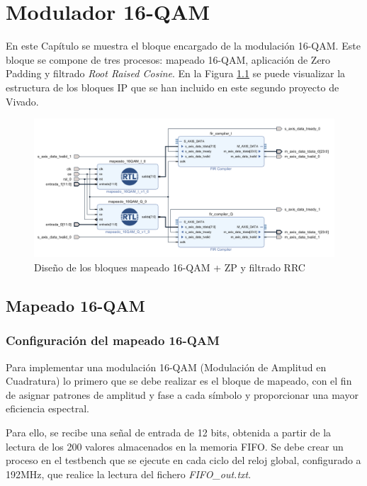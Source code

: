 \chapter{Modulador 16-QAM}
\label{section:qam}


En este Capítulo se muestra el bloque encargado de la modulación 16-QAM. Este bloque se compone de tres procesos: mapeado 16-QAM, aplicación de Zero Padding y filtrado \textit{Root Raised Cosine}. En la Figura \ref{fig:qam_fir} se puede visualizar la estructura de los bloques IP que se han incluido en este segundo proyecto de Vivado. 

\vspace{2mm}

\begin{figure}[h]
	\centering
	\includegraphics[width=1\textwidth]{img/diseno/qam_fir.PNG}
	\caption{Diseño de los bloques mapeado 16-QAM + ZP y filtrado RRC}
	\label{fig:qam_fir}
\end{figure}
    
\vspace{1mm}

\section{Mapeado 16-QAM}

\subsection{Configuración del mapeado 16-QAM}

Para implementar una modulación 16-QAM (Modulación de Amplitud en Cuadratura) lo primero que se debe realizar es el bloque de mapeado, con el fin de asignar patrones de amplitud y fase a cada símbolo y proporcionar una mayor eficiencia espectral. 

\pagebreak

Para ello, se recibe una señal de entrada de 12 bits, obtenida a partir de la lectura de los 200 valores almacenados en la memoria FIFO. Se debe crear un proceso en el testbench que se ejecute en cada ciclo del reloj global, configurado a 192MHz, que realice la lectura del fichero \textit{FIFO\_out.txt}. 

